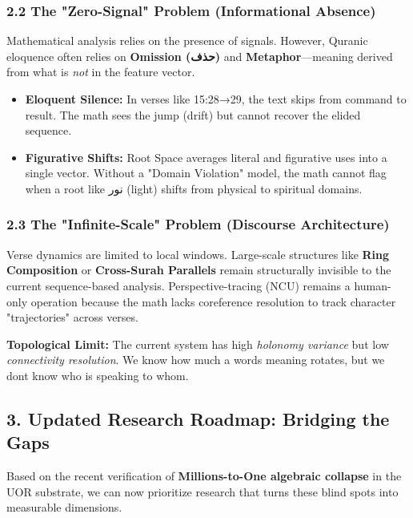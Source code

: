 \documentclass[12pt,a4paper]{article}
\providecommand{\tightlist}{\setlength{\itemsep}{0pt}\setlength{\parskip}{0pt}}
\begin{document}
\subsubsection{2.2 The "Zero-Signal" Problem (Informational
Absence)}\label{the-zero-signal-problem-informational-absence}

Mathematical analysis relies on the presence of signals. However,
Quranic eloquence often relies on \textbf{Omission ({حذف})} and
\textbf{Metaphor}---meaning derived from what is \emph{not} in the
feature vector.

\begin{itemize}
\tightlist
\item
  \textbf{Eloquent Silence:} In verses like 15:28→29, the text skips
  from command to result. The math sees the jump (drift) but cannot
  recover the elided sequence.
\item
  \textbf{Figurative Shifts:} Root Space averages literal and figurative
  uses into a single vector. Without a "Domain Violation" model, the
  math cannot flag when a root like {نور} (light) shifts from physical
  to spiritual domains.
\end{itemize}

\subsubsection{2.3 The "Infinite-Scale" Problem (Discourse
Architecture)}\label{the-infinite-scale-problem-discourse-architecture}

Verse dynamics are limited to local windows. Large-scale structures like
\textbf{Ring Composition} or \textbf{Cross-Surah Parallels} remain
structurally invisible to the current sequence-based analysis.
Perspective-tracing (NCU) remains a human-only operation because the
math lacks coreference resolution to track character "trajectories"
across verses.

\textbf{Topological Limit:} The current system has high \emph{holonomy
variance} but low \emph{connectivity resolution}. We know how much a
word\textquotesingle s meaning rotates, but we don\textquotesingle t
know who is speaking to whom.

\subsection{3. Updated Research Roadmap: Bridging the
Gaps}\label{roadmap}

Based on the recent verification of \textbf{Millions-to-One algebraic
collapse} in the UOR substrate, we can now prioritize research that
turns these blind spots into measurable dimensions.
\end{document}
